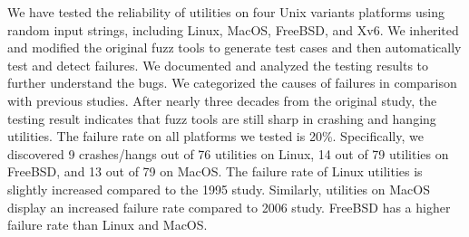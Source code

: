 We have tested the reliability of utilities on four Unix variants platforms using random input strings, including Linux, MacOS, FreeBSD, and Xv6. We inherited and modified the original fuzz tools to generate test cases and then automatically test and detect failures. We documented and analyzed the testing results to further understand the bugs. We categorized the causes of failures in comparison with previous studies. After nearly three decades from the original study, the testing result indicates that fuzz tools are still sharp in crashing and hanging utilities. The failure rate on all platforms we tested is 20\%. 
Specifically, we discovered 9 crashes/hangs out of 76 utilities on Linux, 14 out of 79 utilities on FreeBSD, and 13 out of 79 on MacOS. The failure rate of Linux utilities is slightly increased compared to the 1995 study. Similarly, utilities on MacOS display an increased failure rate compared to 2006 study. FreeBSD has a higher failure rate than Linux and MacOS. 